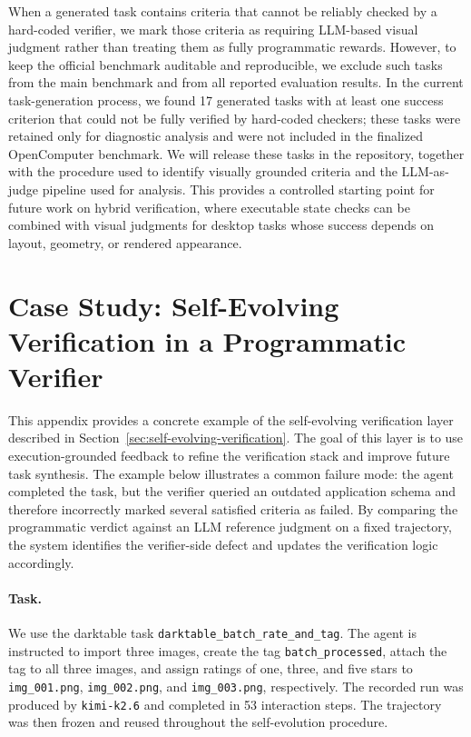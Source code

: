 \documentclass{llmxive}
\begin{document}
When a generated task contains criteria that cannot be reliably checked by a hard-coded verifier, we mark those criteria as requiring LLM-based visual judgment rather than treating them as fully programmatic rewards. However, to keep the official benchmark auditable and reproducible, we exclude such tasks from the main benchmark and from all reported evaluation results. In the current task-generation process, we found 17 generated tasks with at least one success criterion that could not be fully verified by hard-coded checkers; these tasks were retained only for diagnostic analysis and were not included in the finalized OpenComputer benchmark. We will release these tasks in the repository, together with the procedure used to identify visually grounded criteria and the LLM-as-judge pipeline used for analysis. This provides a controlled starting point for future work on hybrid verification, where executable state checks can be combined with visual judgments for desktop tasks whose success depends on layout, geometry, or rendered appearance.

% 





\appendix
\section{Case Study: Self-Evolving Verification in a Programmatic Verifier}
\label{app:self-evolving-verification-case-study}

This appendix provides a concrete example of the self-evolving verification
layer described in Section~\ref{sec:self-evolving-verification}. The goal of this
layer is to use execution-grounded feedback to refine the verification stack and
improve future task synthesis. The example below illustrates a common failure
mode: the agent completed the task, but the verifier queried an outdated
application schema and therefore incorrectly marked several satisfied criteria as
failed. By comparing the programmatic verdict against an LLM reference judgment
on a fixed trajectory, the system identifies the verifier-side defect and updates
the verification logic accordingly.

\paragraph{Task.}
We use the darktable task \texttt{darktable\_batch\_rate\_and\_tag}. The agent is
instructed to import three images, create the tag \texttt{batch\_processed},
attach the tag to all three images, and assign ratings of one, three, and five
stars to \texttt{img\_001.png}, \texttt{img\_002.png}, and
\texttt{img\_003.png}, respectively. The recorded run was produced by
\texttt{kimi-k2.6} and completed in 53 interaction steps. The trajectory was then
frozen and reused throughout the self-evolution procedure.
\end{document}
